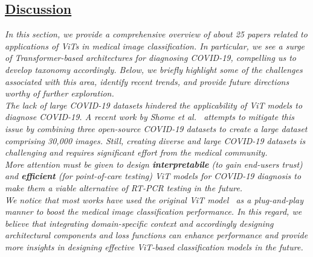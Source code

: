 \documentclass[10pt,journal,compsoc]{IEEEtran}
\begin{document}
\begin{tcolorbox}[top=0.5pt,left=0pt,size=minimal,boxrule = 0pt,breakable, enhanced]
\subsection{\textbf{\underline{Discussion}}}
\hspace{0.75em}\textit{ In this section, we provide a comprehensive overview of about 25 papers related to applications of ViTs in medical image classification. In particular, we see a surge of Transformer-based architectures for diagnosing COVID-19, compelling us to develop taxonomy accordingly. Below, we briefly highlight some of the challenges associated with this area, identify recent trends, and provide future directions worthy of further exploration.}
 \\
\vspace{0.01em}
\textit{ %
The lack of large COVID-19 datasets hindered the applicability of ViT models to diagnose COVID-19. A recent work by Shome \textit{et al.}~\cite{shome2021covid} attempts to mitigate this issue by combining three open-source COVID-19 datasets to create a large dataset comprising 30,000 images. Still, creating diverse and large COVID-19 datasets is challenging and requires significant effort from the medical community.}
\\
\vspace{0.01em}
\textit{ %
More attention must be given to design \textbf{interpretabile} (to gain end-users trust) and \textbf{efficient} (for point-of-care testing) ViT models for COVID-19 diagnosis to make them a viable alternative of RT-PCR testing in the future. 
} 
\\
\vspace{0.01em}
\textit{ We notice that most works have used the original ViT model~\cite{dosovitskiy2020image} as a plug-and-play manner to boost the medical image classification performance. In this regard, we believe that integrating domain-specific context and accordingly designing architectural components and loss functions can enhance performance and provide more insights in designing effective ViT-based classification models in the future.}

\end{tcolorbox}
\end{document}
